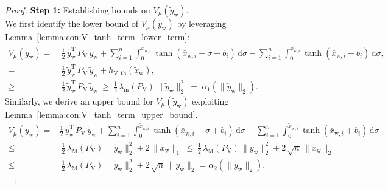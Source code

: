 \begin{proof}
    \textbf{Step 1:} Establishing bounds on $V_\mu(\tilde{y}_\mathrm{w})$.\\
    We first identify the lower bound of $V_\mu(\tilde{y}_\mathrm{w})$ by leveraging Lemma~\ref{lemma:con:V_tanh_term_lower_term}:
    \begin{equation}
    \begin{split}
        V_\mu(\tilde{y}_\mathrm{w}) =& \: \frac{1}{2} \, \tilde{y}_\mathrm{w}^\mathrm{T} \, P_\mathrm{V} \, \tilde{y}_\mathrm{w} + \sum_{i=1}^n \int_{0}^{\tilde{x}_{\mathrm{w},i}} \tanh(\bar{x}_{\mathrm{w},i}+\sigma+b_i) \, \mathrm{d} \sigma - \sum_{i=1}^n \int_{0}^{\tilde{x}_{\mathrm{w},i}} \tanh(\bar{x}_{\mathrm{w},i}+b_i) \, \mathrm{d} \sigma,\\
        =& \: \frac{1}{2} \, \tilde{y}_\mathrm{w}^\mathrm{T} \, P_\mathrm{V} \, \tilde{y}_\mathrm{w} + h_{\mathrm{V},\mathrm{th}}(\tilde{x}_\mathrm{w}),\\
        \geq& \: \frac{1}{2} \, \tilde{y}_\mathrm{w}^\mathrm{T} \, P_\mathrm{V} \, \tilde{y}_\mathrm{w}
        \: \geq \: \frac{1}{2} \, \lambda_\mathrm{m}(P_\mathrm{V}) \, \lVert \tilde{y}_\mathrm{w} \rVert_2^2
        \: = \: \alpha_1(\lVert \tilde{y}_\mathrm{w} \rVert_2).
    \end{split}
    \end{equation}
    Similarly, we derive an upper bound for $V_\mu(\tilde{y}_\mathrm{w})$ exploiting Lemma~\ref{lemma:con:V_tanh_term_upper_bound}.
    \begin{equation}
    \begin{split}
        V_\mu(\tilde{y}_\mathrm{w}) =& \frac{1}{2} \, \tilde{y}_\mathrm{w}^\mathrm{T} \, P_\mathrm{V} \, \tilde{y}_\mathrm{w} + \sum_{i=1}^n \int_{0}^{\tilde{x}_{\mathrm{w},i}} \tanh(\bar{x}_{\mathrm{w},i}+\sigma+b_i) \, \mathrm{d} \sigma - \sum_{i=1}^n \int_{0}^{\tilde{x}_{\mathrm{w},i}} \tanh(\bar{x}_{\mathrm{w},i}+b_i) \, \mathrm{d} \sigma\\
        \leq& \: \frac{1}{2} \, \lambda_\mathrm{M}(P_\mathrm{V}) \, \lVert \tilde{y}_\mathrm{w} \rVert_2^2 + 2 \, \lVert\tilde{x}_\mathrm{w}\rVert_1
        \: \leq \: \frac{1}{2} \, \lambda_\mathrm{M}(P_\mathrm{V}) \, \lVert \tilde{y}_\mathrm{w} \rVert_2^2 + 2 \, \sqrt{n} \, \lVert\tilde{x}_\mathrm{w}\rVert_2\\
        \leq& \: \frac{1}{2} \, \lambda_\mathrm{M}(P_\mathrm{V}) \, \lVert \tilde{y}_\mathrm{w} \rVert_2^2 + 2 \, \sqrt{n} \, \lVert\tilde{y}_\mathrm{w}\rVert_2 = \alpha_2(\lVert\tilde{y}_\mathrm{w}\rVert_2).
    \end{split}
    \end{equation}


\end{proof}
